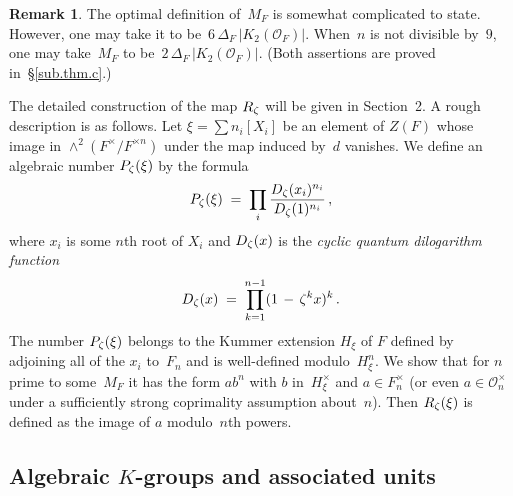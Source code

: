 \documentclass[12pt,reqno]{amsart}
\theoremstyle{definition}
\newtheorem{remark}[theorem]{Remark}
\newcommand{\changed}[1]{{#1}}
\def\be{\begin{equation}}
\def\ee{\end{equation}}
\def\m{\,-\,}
\def\={\;=\;}
\def\Q{\mathbf Q}   %
\def\Z{\mathbf Z}   %
\def\nn{n}
\def\OL{\mathcal{O}}
\begin{document}
\begin{remark} \label{quotableremark}
The optimal definition of~$M_F$ is somewhat complicated to state. However, one may
take it to be~$6\,\Delta_F\,|K_2(\OL_F)|$. \changed{When~$n$ is not
divisible by~$9$, one may take~$M_F$ to be~$2 \,\Delta_F\,|K_2(\OL_F)|$.
(Both assertions are proved in~\S\ref{sub.thm.c}.)}
%
\end{remark}

The detailed construction of the map $R_\zeta$ will be given in Section~2. A 
rough description is as follows.  Let $\xi=\sum n_i[X_i]$ be an element of 
$Z(F)$ whose image in $\wedge^2(F^\times/F^{\times \nn})$ under the map induced 
by~$d$ vanishes. We define an algebraic number $P_\zeta(\xi)$ by the formula 
\be 
\label{defRz}
 P_\z(\xi) \= \prod_i \changed{\frac{D_\z(x_i)^{n_i}}{D_{\z}(1)^{n_i}}} \,, 
\ee
where $x_i$ is some $\nn$th root of $X_i$ and $D_\zeta(x)$ is the 
{\it cyclic quantum dilogarithm function} 
\be
\label{defDz}
 D_\z(x) \= \prod_{k=1}^{\nn-1}(1\m \z^k x)^k\,.  
\ee
The number $P_\zeta(\xi)$ belongs to the Kummer extension $H_\xi$ of $F$ defined 
by adjoining all of the $x_i$ to~$F_\nn$ and is well-defined modulo~$H_\xi^\nn$. 
We show that for $\nn$ prime to some~$M_F$ it has the form $ab^{\nn}$ with $b$ 
in~$H_\xi^\times$ and $a\in F_\nn^\times$ (or even $a\in\OL^{\times}_\nn$ under a
sufficiently strong coprimality assumption about~$\nn$).
Then $R_\zeta(\xi)$ is defined as the image of $a$ modulo~$\nn$th powers.

\subsection{Algebraic \texorpdfstring{$K$}{K}-groups and associated units}
\label{sub.intro.Ktheory} 
\end{document}

